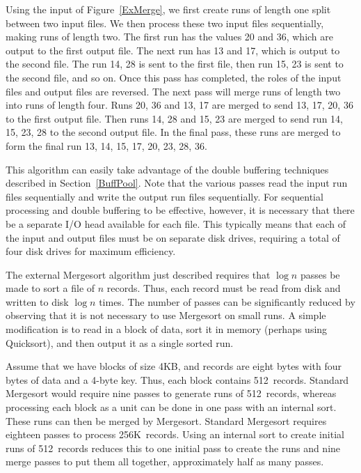 \begin{example}
Using the input of Figure~\ref{ExMerge}, we first create runs of
length one split between two input files.
We then process these two input files sequentially, making runs of
length two.
The first run has the values 20 and 36, which are output to the first
output file.
The next run has 13 and 17, which is output to the second file.
The run 14, 28 is sent to the first file, then run 15, 23 is sent to
the second file, and so on.
Once this pass has completed, the roles of the input files and output
files are reversed.
The next pass will merge runs of length two into runs of length four.
Runs 20, 36 and 13, 17 are merged to send 13, 17, 20, 36 to the first
output file.
Then runs 14, 28 and 15, 23 are merged to send run 14, 15, 23, 28 to
the second output file.
In the final pass, these runs are merged to form the final run 13, 14,
15, 17, 20, 23, 28, 36.
\end{example}

This algorithm can easily take advantage of the
double buffering
techniques described in Section~\ref{BuffPool}.
Note that the various passes read the input run files
sequentially and write the output run files sequentially.
For sequential processing and double buffering to be effective,
however, it is necessary that there be a separate I/O head available
for each file.
This typically means that each of the input and output files must be
on separate disk drives, requiring a total of four disk drives for
maximum efficiency.

The external Mergesort algorithm just described requires that
\(\log n\) passes be made to sort a file of \(n\) records.
Thus, each record must be read from disk and written to disk \(\log n\)
times.
The number of passes can be significantly reduced by observing that
it is not necessary to use Mergesort on small runs.
A simple modification is to read in a block of data, sort it in
memory (perhaps using Quicksort), and then output it as a single
sorted run.

\begin{example}
Assume that we have blocks of size 4KB, and records are eight bytes
with four bytes of data and a 4-byte key.
Thus, each block contains 512~records.
Standard Mergesort would require nine passes to generate runs of
512~records, whereas processing each block as a unit can be done
in one pass with an internal sort.
These runs can then be merged by Mergesort.
Standard Mergesort requires eighteen passes to process 256K~records.
Using an internal sort to create initial runs of 512~records reduces
this to one initial pass to create the runs and nine merge passes to
put them all together, approximately half as many passes.
\end{example}

